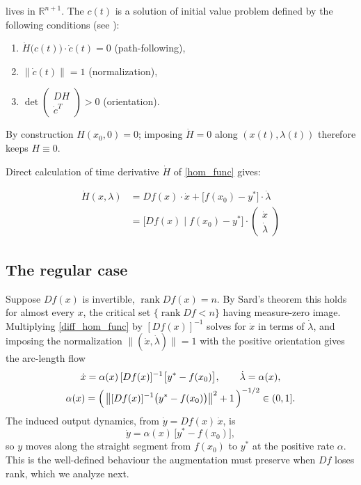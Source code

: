 \documentclass[11pt,american]{article}
\DeclareMathOperator{\rank}{\operatorname{rank}}
\theoremstyle{definition}
\theoremstyle{plain}
\theoremstyle{remark}
\begin{document}
lives in $\mathbb{R}^{n+1}$. The $c(t)$ is a solution of initial value problem defined by the following conditions (see \cite[Sec.~2.1]{AllgowerGeorg1990}):

\begin{enumerate}
\item[(i)] $\dot H\bigl(c(t)\bigr)\cdot \dot c(t) = 0$ (path-following),
\item[(ii)] $\|\dot c(t)\| = 1$ (normalization),
\item[(iii)] $\det\begin{pmatrix} DH \\ \dot c^T \end{pmatrix} > 0$ (orientation).
\end{enumerate}

By construction $H(x_0,0) = 0$; imposing $\dot H = 0$ along $(x(t),\lambda(t))$ therefore keeps $H \equiv 0$.

Direct calculation of time derivative $\dot H$ of \eqref{hom_func} gives:

\begin{align}\label{diff_hom_func}
\dot H(x,\lambda) &= D f(x) \cdot \dot x + \bigl[ f(x_0) - y^* \bigr] \cdot \dot \lambda \\
&= \bigl[ D f(x) \; \big| \; f(x_0) - y^* \bigr] \cdot \begin{pmatrix} \dot x \\ \dot \lambda \end{pmatrix}
\end{align}

\subsection{The regular case}

Suppose $Df(x)$ is invertible, $\rank Df(x) = n$. By Sard's theorem this holds for almost every $x$, the critical set $\{\rank Df < n\}$ having measure-zero image. Multiplying \eqref{diff_hom_func} by $[Df(x)]^{-1}$ solves for $\dot x$ in terms of $\dot\lambda$, and imposing the normalization $\|(\dot x,\dot\lambda)\| = 1$ with the positive orientation gives the arc-length flow
\begin{gather}
\dot x = \alpha(x)\,[Df(x)]^{-1}\bigl[y^* - f(x_0)\bigr], \qquad \dot\lambda = \alpha(x),\\
\alpha(x) = \Bigl(\, \bigl\|[Df(x)]^{-1}\bigl(y^*-f(x_0)\bigr)\bigr\|^2 + 1 \,\Bigr)^{-1/2} \in (0,1].
\end{gather}
The induced output dynamics, from $\dot y = Df(x)\,\dot x$, is
\begin{equation}
\dot y = \alpha(x)\,\bigl[y^* - f(x_0)\bigr],
\end{equation}
so $y$ moves along the straight segment from $f(x_0)$ to $y^*$ at the positive rate $\alpha$. This is the well-defined behaviour the augmentation must preserve when $Df$ loses rank, which we analyze next.
\end{document}
